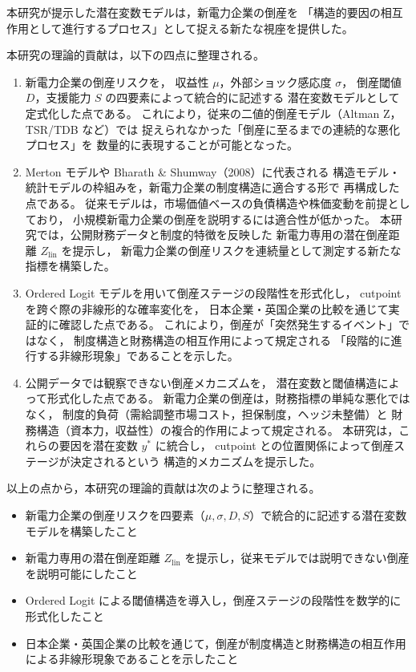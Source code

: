 本研究が提示した潜在変数モデルは，新電力企業の倒産を
「構造的要因の相互作用として進行するプロセス」として捉える新たな視座を提供した。

本研究の理論的貢献は，以下の四点に整理される。

\begin{enumerate}
    \item 新電力企業の倒産リスクを，
    収益性 $\mu$，外部ショック感応度 $\sigma$，
    倒産閾値 $D$，支援能力 $S$ の四要素によって統合的に記述する
    潜在変数モデルとして定式化した点である。
    これにより，従来の二値的倒産モデル（Altman Z，TSR/TDB など）では
    捉えられなかった「倒産に至るまでの連続的な悪化プロセス」を
    数量的に表現することが可能となった。

    \item Merton モデルや Bharath \& Shumway（2008）に代表される
    構造モデル・統計モデルの枠組みを，新電力企業の制度構造に適合する形で
    再構成した点である。
    従来モデルは，市場価値ベースの負債構造や株価変動を前提としており，
    小規模新電力企業の倒産を説明するには適合性が低かった。
    本研究では，公開財務データと制度的特徴を反映した
    新電力専用の潜在倒産距離 \(Z_{\text{lin}}\) を提示し，
    新電力企業の倒産リスクを連続量として測定する新たな指標を構築した。

    \item Ordered Logit モデルを用いて倒産ステージの段階性を形式化し，
    cutpoint を跨ぐ際の非線形的な確率変化を，
    日本企業・英国企業の比較を通じて実証的に確認した点である。
    これにより，倒産が「突然発生するイベント」ではなく，
    制度構造と財務構造の相互作用によって規定される
    「段階的に進行する非線形現象」であることを示した。

    \item 公開データでは観察できない倒産メカニズムを，
    潜在変数と閾値構造によって形式化した点である。
    新電力企業の倒産は，財務指標の単純な悪化ではなく，
    制度的負荷（需給調整市場コスト，担保制度，ヘッジ未整備）と
    財務構造（資本力，収益性）の複合的作用によって規定される。
    本研究は，これらの要因を潜在変数 $y^*$ に統合し，
    cutpoint との位置関係によって倒産ステージが決定されるという
    構造的メカニズムを提示した。
\end{enumerate}

以上の点から，本研究の理論的貢献は次のように整理される。

\begin{itemize}
    \item 新電力企業の倒産リスクを四要素（$\mu,\sigma,D,S$）で統合的に記述する潜在変数モデルを構築したこと
    \item 新電力専用の潜在倒産距離 \(Z_{\text{lin}}\) を提示し，従来モデルでは説明できない倒産を説明可能にしたこと
    \item Ordered Logit による閾値構造を導入し，倒産ステージの段階性を数学的に形式化したこと
    \item 日本企業・英国企業の比較を通じて，倒産が制度構造と財務構造の相互作用による非線形現象であることを示したこと
\end{itemize}

